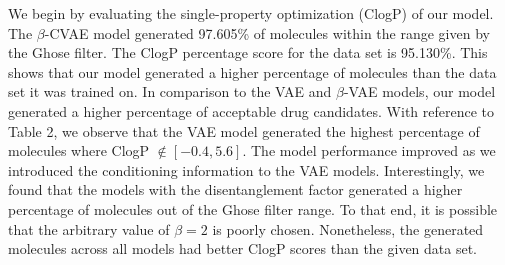 \begin{table}[t]
\caption{Generated Molecular Results}
\label{tab2}
\end{table}


We begin by evaluating the single-property optimization (ClogP) of our model. The $\beta$-CVAE model generated 97.605\% of molecules within the range given by the Ghose filter. The ClogP percentage score for the data set is 95.130\%. This shows that our model generated a higher percentage of molecules than the data set it was trained on. In comparison to the VAE and $\beta$-VAE models, our model generated a higher percentage of acceptable drug candidates. With reference to Table 2, we observe that the VAE model generated the highest percentage of molecules where ClogP $\notin [-0.4, 5.6]$. The model performance improved as we introduced the conditioning information to the VAE models. Interestingly, we found that the models with the disentanglement factor generated a higher percentage of molecules out of the Ghose filter range. To that end, it is possible that the arbitrary value of $\beta = 2$ is poorly chosen. Nonetheless, the generated molecules across all models had better ClogP scores than the given data set. 

